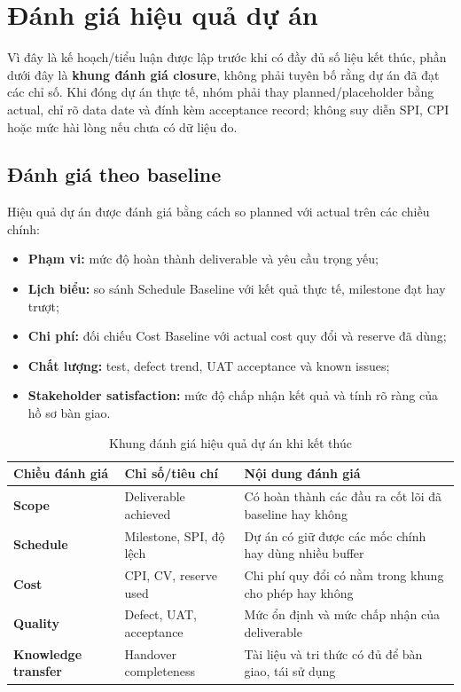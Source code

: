 \section{Đánh giá hiệu quả dự án}

Vì đây là kế hoạch/tiểu luận được lập trước khi có đầy đủ số liệu kết thúc, phần dưới đây là \textbf{khung đánh giá closure}, không phải tuyên bố rằng dự án đã đạt các chỉ số. Khi đóng dự án thực tế, nhóm phải thay planned/placeholder bằng actual, chỉ rõ data date và đính kèm acceptance record; không suy diễn SPI, CPI hoặc mức hài lòng nếu chưa có dữ liệu đo.

\subsection{Đánh giá theo baseline}

Hiệu quả dự án được đánh giá bằng cách so planned với actual trên các chiều chính:

\begin{itemize}
  \item \textbf{Phạm vi:} mức độ hoàn thành deliverable và yêu cầu trọng yếu;
  \item \textbf{Lịch biểu:} so sánh Schedule Baseline với kết quả thực tế, milestone đạt hay trượt;
  \item \textbf{Chi phí:} đối chiếu Cost Baseline với actual cost quy đổi và reserve đã dùng;
  \item \textbf{Chất lượng:} test, defect trend, UAT acceptance và known issues;
  \item \textbf{Stakeholder satisfaction:} mức độ chấp nhận kết quả và tính rõ ràng của hồ sơ bàn giao.
\end{itemize}

\begin{table}[H]
\centering
\caption{Khung đánh giá hiệu quả dự án khi kết thúc}
\label{tab:closure-evaluation}
\begin{tabularx}{\textwidth}{| >{\bfseries}p{3.2cm} | p{3.8cm} | X |}
\hline
Chiều đánh giá & Chỉ số/tiêu chí & Nội dung đánh giá \\
\hline
Scope & Deliverable achieved & Có hoàn thành các đầu ra cốt lõi đã baseline hay không \\ \hline
Schedule & Milestone, SPI, độ lệch & Dự án có giữ được các mốc chính hay dùng nhiều buffer \\ \hline
Cost & CPI, CV, reserve used & Chi phí quy đổi có nằm trong khung cho phép hay không \\ \hline
Quality & Defect, UAT, acceptance & Mức ổn định và mức chấp nhận của deliverable \\ \hline
Knowledge transfer & Handover completeness & Tài liệu và tri thức có đủ để bàn giao, tái sử dụng \\
\hline
\end{tabularx}
\end{table}

